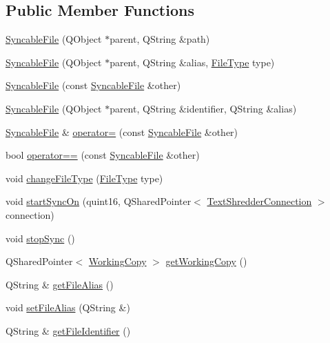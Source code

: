 \subsection*{Public Member Functions}
\begin{DoxyCompactItemize}
\item 
\hyperlink{class_syncable_file_a526bff9bfae19da3eb36da1160d5fbe3}{SyncableFile} (QObject $\ast$parent, QString \&path)
\item 
\hyperlink{class_syncable_file_a76a84186e9e262ede70f2362c4efc2b1}{SyncableFile} (QObject $\ast$parent, QString \&alias, \hyperlink{syncablefile_8h_a2c794c5c13ab4dd7e65bad031dbe41c3}{FileType} type)
\item 
\hyperlink{class_syncable_file_a07ed75f67e26b5f8a258c12c11209ee1}{SyncableFile} (const \hyperlink{class_syncable_file}{SyncableFile} \&other)
\item 
\hyperlink{class_syncable_file_af420d72b6a6446840e2f6720343a53bc}{SyncableFile} (QObject $\ast$parent, QString \&identifier, QString \&alias)
\item 
\hyperlink{class_syncable_file}{SyncableFile} \& \hyperlink{class_syncable_file_ad28f7c64481102e24a9b92bdfa5d81d5}{operator=} (const \hyperlink{class_syncable_file}{SyncableFile} \&other)
\item 
bool \hyperlink{class_syncable_file_ac7e8ec7d9b962ac3b8a03fc44ffe5f84}{operator==} (const \hyperlink{class_syncable_file}{SyncableFile} \&other)
\item 
void \hyperlink{class_syncable_file_a7ddbefbcb6915bde00852900b240af23}{changeFileType} (\hyperlink{syncablefile_8h_a2c794c5c13ab4dd7e65bad031dbe41c3}{FileType} type)
\item 
void \hyperlink{class_syncable_file_ad13755c7315c239c569af843997c0ffa}{startSyncOn} (quint16, QSharedPointer$<$ \hyperlink{class_text_shredder_connection}{TextShredderConnection} $>$ connection)
\item 
void \hyperlink{class_syncable_file_ac62b1f7bb6afa0489c76a047dab9b203}{stopSync} ()
\item 
QSharedPointer$<$ \hyperlink{class_working_copy}{WorkingCopy} $>$ \hyperlink{class_syncable_file_ab646e7a3e628ec2eaf0a00110eda20f8}{getWorkingCopy} ()
\item 
QString \& \hyperlink{class_syncable_file_ab566d4933d0d04e9cd2551aa1c2f468a}{getFileAlias} ()
\item 
void \hyperlink{class_syncable_file_a38be63e6cef6773c25d1c5f1daccc080}{setFileAlias} (QString \&)
\item 
QString \& \hyperlink{class_syncable_file_a85be83dfe6ce5c3272aaef26bb45b1ef}{getFileIdentifier} ()

\end{DoxyCompactItemize}

